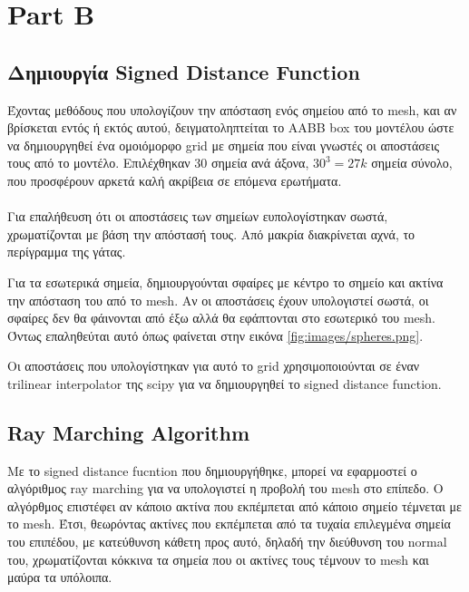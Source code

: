 \documentclass{report}
\begin{document}
\chapter{Part B}

\section{Δημιουργία Signed Distance Function}
Έχοντας μεθόδους που υπολογίζουν την απόσταση ενός σημείου από το mesh, και αν βρίσκεται εντός ή εκτός αυτού, δειγματοληπτείται
το AABB box του μοντέλου ώστε να δημιουργηθεί ένα ομοιόμορφο grid με σημεία που είναι γνωστές οι αποστάσεις τους 
από το μοντέλο. Επιλέχθηκαν 30 σημεία ανά άξονα, $30^3 = 27k$ σημεία σύνολο, που προσφέρουν αρκετά καλή ακρίβεια σε
επόμενα ερωτήματα.
\\\\
Για επαλήθευση ότι οι αποστάσεις των σημείων ευπολογίστηκαν σωστά, χρωματίζονται με βάση την απόστασή τους. Από μακρία
διακρίνεται αχνά, το περίγραμμα της γάτας.


Για τα εσωτερικά σημεία, δημιουργούνται σφαίρες με κέντρο το σημείο και ακτίνα την απόσταση του από το mesh. Αν οι αποστάσεις έχουν
υπολογιστεί σωστά, οι σφαίρες δεν θα φάινονται από έξω αλλά θα εφάπτονται στο εσωτερικό του mesh. Όντως επαληθεύται αυτό 
όπως φαίνεται στην εικόνα \ref{fig:images/spheres.png}.


Οι αποστάσεις που υπολογίστηκαν για αυτό το grid χρησιμοποιούνται σε έναν trilinear interpolator της scipy \cite{2020SciPy-NMeth}
για να δημιουργηθεί το signed distance function.

\section{Ray Marching Algorithm}
Με το signed distance fucntion που δημιουργήθηκε, μπορεί να εφαρμοστεί ο αλγόριθμος ray marching για να υπολογιστεί η
προβολή του mesh στο επίπεδο. Ο αλγόρθμος επιστέφει αν κάποιο ακτίνα που εκπέμπεται από κάποιο σημείο τέμνεται με το mesh.
Έτσι, θεωρόντας ακτίνες που εκπέμπεται από τα τυχαία επιλεγμένα σημεία του επιπέδου, με κατεύθυνση κάθετη προς αυτό, δηλαδή
την διεύθυνση του normal του, χρωματίζονται κόκκινα τα σημεία που οι ακτίνες τους τέμνουν το mesh και μαύρα τα υπόλοιπα.
\end{document}
